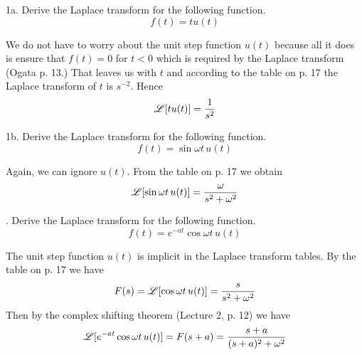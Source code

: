 \documentclass[11pt]{report}
\begin{document}
\noindent
1a. Derive the Laplace transform for the following function.
$$f(t)=tu(t)$$

\bigskip
\noindent
We do not have to worry about the unit step function $u(t)$ because all
it does is ensure that $f(t) = 0$ for $t<0$ which is required by the
Laplace transform
(Ogata p. 13.)
That leaves us with $t$ and according to the table on p. 17
the Laplace transform of $t$ is $s^{-2}$.
Hence
$${\mathscr L}[tu(t)]={1\over s^2}$$

\bigskip
\noindent
1b. Derive the Laplace transform for the following function.
$$f(t)=\sin\omega t\,u(t)$$

\bigskip
\noindent
Again, we can ignore $u(t)$.
From the table on p. 17 we obtain
$${\mathscr L}[\sin\omega t\,u(t)]={\omega\over s^2+\omega^2}$$

\bigskip
{}. Derive the Laplace transform for the following function.
$$f(t)=e^{-at}\cos\omega t\,u(t)$$

\bigskip
\noindent
The unit step function $u(t)$ is implicit in the Laplace transform tables.
By the table on p. 17 we have
$$F(s)={\mathscr L}[\cos\omega t\,u(t)]={s\over s^2+\omega^2}$$
Then by the complex shifting theorem (Lecture 2, p. 12) we have
$${\mathscr L}[e^{-at}\cos\omega t\,u(t)]=F(s+a)={s+a\over (s+a)^2+\omega^2}$$
\end{document}
